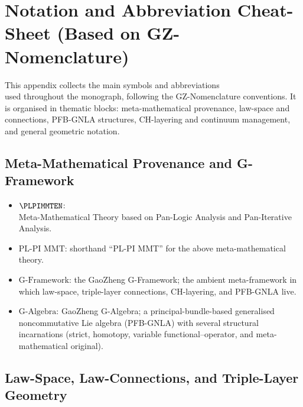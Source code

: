 \documentclass[11pt]{book}
\theoremstyle{plain}
\theoremstyle{definition}
\newcommand{\PLPIMMT}{\text{PL-PI MMT}}
\newcommand{\GFramework}{\text{G-Framework}} \newcommand{\GAlgebra}{\text{G-Algebra}}
\begin{document}
\chapter[Notation and Abbreviation Cheat-Sheet]{Notation and Abbreviation Cheat-Sheet (Based on GZ-Nomenclature)}


This appendix collects the main symbols and abbreviations \\ used 
throughout the monograph, following the GZ-Nomenclature conventions.
It is organised in thematic blocks: meta-mathematical provenance,
law-space and connections, PFB-GNLA structures, CH-layering and
continuum management, and general geometric notation.



\section{Meta-Mathematical Provenance and G-Framework}


\begin{itemize}
  \item $\PLPIMMTEN$:\\
        Meta-Mathematical Theory based on Pan-Logic Analysis and
        Pan-Iterative Analysis.
\item $\PLPIMMT$:
        shorthand “PL-PI MMT” for the above meta-mathematical theory.
\item $\GFramework$:
        the GaoZheng G-Framework; the ambient meta-framework in which
        law-space, triple-layer connections, CH-layering, and PFB-GNLA
        live.
\item $\GAlgebra$:
        GaoZheng G-Algebra; a principal-bundle-based generalised
        noncommutative Lie algebra (PFB-GNLA) with several structural
        incarnations (strict, homotopy, variable functional--operator,
        and meta-mathematical original).
\end{itemize}

\section{Law-Space, Law-Connections, and Triple-Layer Geometry}
\end{document}
